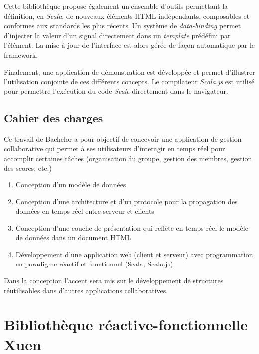 \documentclass[11pt, a4paper, twoside, frenchb]{book}
\begin{document}
Cette bibliothèque propose également un ensemble d'outils permettant la définition, en \emph{Scala}, de nouveaux éléments HTML indépendants, composables et conformes aux standards les plus récents. Un système de \emph{data-binding} permet d'injecter la valeur d'un signal directement dans un \emph{template} prédéfini par l'élément. La mise à jour de l'interface est alors gérée de façon automatique par le framework.

Finalement, une application de démonstration est développée et permet d'illustrer l'utilisation conjointe de ces différents concepts. Le compilateur \emph{Scala.js} est utilisé pour permettre l'exécution du code \emph{Scala} directement dans le navigateur.

\chapter*{Cahier des charges}

Ce travail de Bachelor a pour objectif de concevoir une application de gestion collaborative qui permet à ses utilisateurs d'interagir en temps réel pour accomplir certaines tâches (organisation du groupe, gestion des membres, gestion des scores, etc.)

\begin{enumerate}
	\item Conception d'un modèle de données
	
	\item  Conception d'une architecture et d'un protocole pour la propagation des données en temps réel entre serveur et clients
	
	\item  Conception d'une couche de présentation qui reflète en temps réel le modèle de données dans un document HTML
	
	\item  Développement d'une application web (client et serveur) avec programmation en paradigme réactif et fonctionnel (Scala, Scala.js)
\end{enumerate}

Dans la conception l'accent sera mis sur le développement de structures réutilisables dans d'autres applications collaboratives.

\tableofcontents

\mainmatter


\part[Bibliothèque réactive-fonctionnelle]{Bibliothèque réactive-fonctionnelle \\
	\vspace{1cm} {\normalfont Xuen}}


%
%
%
\end{document}
